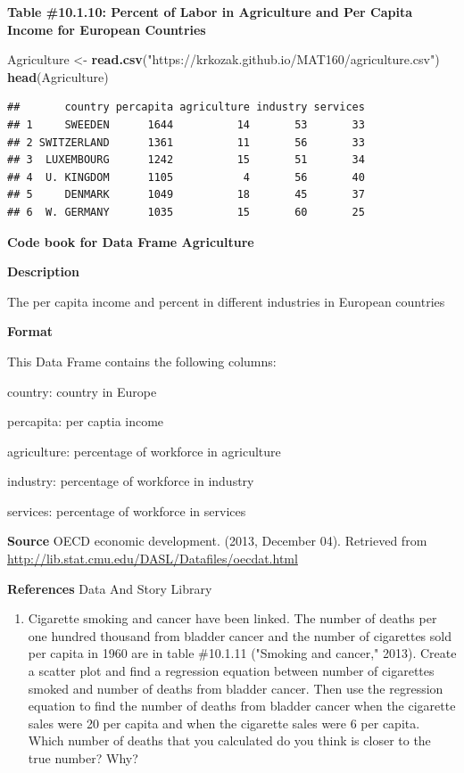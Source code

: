 \documentclass[
]{book}
\newenvironment{Shaded}{\begin{snugshade}}{\end{snugshade}}
\newcommand{\KeywordTok}[1]{\textcolor[rgb]{0.13,0.29,0.53}{\textbf{#1}}}
\newcommand{\NormalTok}[1]{#1}
\newcommand{\StringTok}[1]{\textcolor[rgb]{0.31,0.60,0.02}{#1}}
\providecommand{\tightlist}{%
  \setlength{\itemsep}{0pt}\setlength{\parskip}{0pt}}
\begin{document}
\textbf{Table \#10.1.10: Percent of Labor in Agriculture and Per Capita Income for European Countries}

\begin{Shaded}
\begin{Highlighting}[]
\NormalTok{Agriculture <-}\StringTok{ }\KeywordTok{read.csv}\NormalTok{(}\StringTok{"https://krkozak.github.io/MAT160/agriculture.csv"}\NormalTok{)}
\KeywordTok{head}\NormalTok{(Agriculture)}
\end{Highlighting}
\end{Shaded}

\begin{verbatim}
##       country percapita agriculture industry services
## 1     SWEEDEN      1644          14       53       33
## 2 SWITZERLAND      1361          11       56       33
## 3  LUXEMBOURG      1242          15       51       34
## 4  U. KINGDOM      1105           4       56       40
## 5     DENMARK      1049          18       45       37
## 6  W. GERMANY      1035          15       60       25
\end{verbatim}

\textbf{Code book for Data Frame Agriculture}

\textbf{Description}

The per capita income and percent in different industries in European countries

\textbf{Format}

This Data Frame contains the following columns:

country: country in Europe

percapita: per captia income

agriculture: percentage of workforce in agriculture

industry: percentage of workforce in industry

services: percentage of workforce in services

\textbf{Source}
OECD economic development. (2013, December 04). Retrieved from
\url{http://lib.stat.cmu.edu/DASL/Datafiles/oecdat.html}

\textbf{References}
Data And Story Library

\begin{enumerate}
\def\labelenumi{\arabic{enumi}.}
\setcounter{enumi}{8}
\tightlist
\item
  Cigarette smoking and cancer have been linked. The number of deaths per one hundred thousand from bladder cancer and the number of cigarettes sold per capita in 1960 are in table \#10.1.11 ("Smoking and cancer," 2013). Create a scatter plot and find a regression equation between number of cigarettes smoked and number of deaths from bladder cancer. Then use the regression equation to find the number of deaths from bladder cancer when the cigarette sales were 20 per capita and when the cigarette sales were 6 per capita. Which number of deaths that you calculated do you think is closer to the true number? Why?
\end{enumerate}
\end{document}
